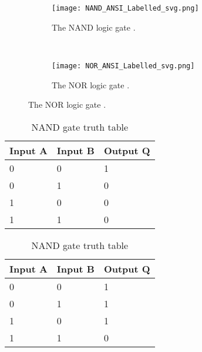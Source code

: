 \begin{figure}[H]
  \centering
  \begin{subfigure}[h]{0.4\textwidth}
  \centering
  \texttt{[image: NAND\_ANSI\_Labelled\_svg.png]}
  \caption{The NAND logic gate \cite{nandwiki}.}
  \label{fig:NAND}
\end{subfigure}
~
  \begin{subfigure}[h]{0.4\textwidth}
  \centering
  \texttt{[image: NOR\_ANSI\_Labelled\_svg.png]}
  \caption{The NOR logic gate \cite{norwiki}.}
  \label{fig:NOR}
  \end{subfigure}
\end{figure}

\begin{table}[!htb]
    \caption{Global caption}
    \begin{subtable}{.5\linewidth}
      \centering
        \begin{tabular}{|l|l||l|}
        \hline
        Input A & Input B & Output Q \\ \hline
        0       & 0       & 1       \\ 
        0       & 1       & 0       \\ 
        1       & 0       & 0       \\ 
        1       & 1       & 0       \\
        \hline
    \end{tabular}
    \caption{NOR gate truth table}
    \end{subtable}
    \begin{subtable}{.5\linewidth}
      \centering
        \begin{tabular}{|l|l||l|}
        \hline
        Input A & Input B & Output Q \\ \hline
        0       & 0       & 1       \\ 
        0       & 1       & 1       \\ 
        1       & 0       & 1       \\ 
        1       & 1       & 0       \\
        \hline
    \end{tabular}
    \caption{NAND gate truth table}
    \end{subtable} 
\end{table}


\begin{comment}
reversible logic




\begin{figure}[h!]
\begin{align*}
\Qcircuit @C=0.5cm @R=0.7cm
{%
&\lstick{S_1} &\gate{H} &\ctrl{1} &\qw \\
&\lstick{S_0} &\ctrl{-1} &\targ &\qw \\}
\end{align*}
\caption{Schur transform for 2 qubits}
\label{cir:vanilla2}
\end{figure}

\end{comment}